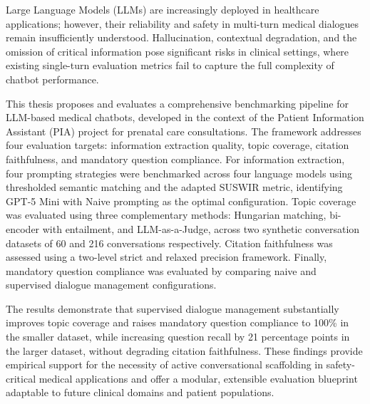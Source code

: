\noindent

Large Language Models (LLMs) are increasingly deployed in healthcare applications; however, their reliability and safety in multi-turn medical dialogues remain insufficiently understood. 
Hallucination, contextual degradation, and the omission of critical information pose significant risks in clinical settings, where existing single-turn evaluation metrics fail to capture the full complexity of chatbot performance.

This thesis proposes and evaluates a comprehensive benchmarking pipeline for LLM-based medical chatbots, developed in the context of the Patient Information Assistant (PIA) project for prenatal care consultations. 
The framework addresses four evaluation targets: information extraction quality, topic coverage, citation faithfulness, and mandatory question compliance. 
For information extraction, four prompting strategies were benchmarked across four language models using thresholded semantic matching and the adapted SUSWIR metric, identifying GPT-5 Mini with Naive prompting as the optimal configuration. 
Topic coverage was evaluated using three complementary methods: Hungarian matching, bi-encoder with entailment, and LLM-as-a-Judge, across two synthetic conversation datasets of 60 and 216 conversations respectively. 
Citation faithfulness was assessed using a two-level strict and relaxed precision framework. 
Finally, mandatory question compliance was evaluated by comparing naive and supervised dialogue management configurations.

The results demonstrate that supervised dialogue management substantially improves topic coverage and raises mandatory question compliance to 100\% in the smaller dataset, while increasing question recall by 21 percentage points in the larger dataset, without degrading citation faithfulness. 
These findings provide empirical support for the necessity of active conversational scaffolding in safety-critical medical applications and offer a modular, extensible evaluation blueprint adaptable to future clinical domains and patient populations.


